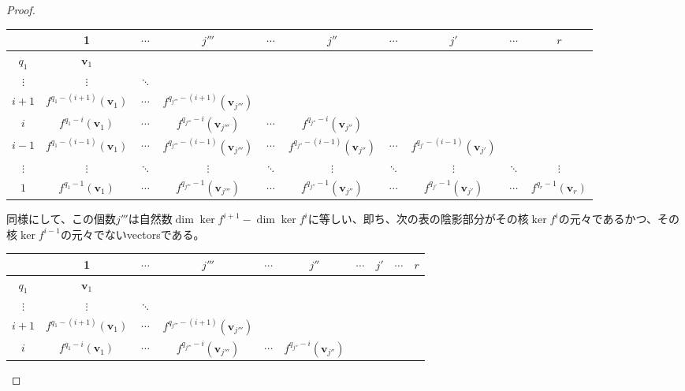 \documentclass[dvipdfmx]{jsarticle}
\begin{document}
\begin{proof}
\begin{longtable}[c]{c|ccccccccc}
&1&$\cdots$&$j'''$&$\cdots$&$j''$&$\cdots$&$j'$&$\cdots$&$r$ \\
\hline
$q_{1}$ & $\mathbf{v}_{1}$ & & & & & & & & \\
$\vdots$ & $\vdots$ & $\ddots$ & & & & & & & \\
$i + 1$ & $f^{q_{1} - (i + 1)}\left( \mathbf{v}_{1} \right)$ & $\cdots$ & $f^{q_{j'''} - (i + 1)}\left( \mathbf{v}_{j'''} \right)$ & & & & & & \\
$i$ & \cellcolor{lightgray} $f^{q_{1} - i}\left( \mathbf{v}_{1} \right)$ & \cellcolor{lightgray} $\cdots$ & \cellcolor{lightgray} $f^{q_{j'''} - i}\left( \mathbf{v}_{j'''} \right)$ & \cellcolor{lightgray} $\cdots$ & \cellcolor{lightgray} $f^{q_{j''} - i}\left( \mathbf{v}_{j''} \right)$ & & & & \\
$i - 1$ & $f^{q_{1} - (i - 1)}\left( \mathbf{v}_{1} \right)$ & $\cdots$ & $f^{q_{j'''} - (i - 1)}\left( \mathbf{v}_{j'''} \right)$ & $\cdots$ & $f^{q_{j''} - (i - 1)}\left( \mathbf{v}_{j''} \right)$ & $\cdots$ &
$f^{q_{j'} - (i - 1)}\left( \mathbf{v}_{j'} \right)$ & & \\
$\vdots$ & $\vdots$ & $\ddots$ & $\vdots$ & $\ddots$ & $\vdots$ & $\ddots$ & $\vdots$ & $\ddots$ & $\vdots$ \\
$1$ & $f^{q_{1} - 1}\left( \mathbf{v}_{1} \right)$ & $\cdots$ & $f^{q_{j'''} - 1}\left( \mathbf{v}_{j'''} \right)$ & $\cdots$ & $f^{q_{j''} - 1}\left( \mathbf{v}_{j''} \right)$ & $\cdots$ & $f^{q_{j'} - 1}\left( \mathbf{v}_{j'} \right)$ & $\cdots$ & $f^{q_{r} - 1}\left( \mathbf{v}_{r} \right)$ \\
\end{longtable}
同様にして、この個数$j'''$は自然数$\dim{\ker f^{i + 1}} - \dim{\ker f^{i}}$に等しい、即ち、次の表の陰影部分がその核$\ker f^{i}$の元々であるかつ、その核$\ker f^{i - 1}$の元々でないvectorsである。
\begin{longtable}[c]{c|ccccccccc}
&1&$\cdots$&$j'''$&$\cdots$&$j''$&$\cdots$&$j'$&$\cdots$&$r$ \\
\hline
$q_{1}$ & $\mathbf{v}_{1}$ & & & & & & & & \\
$\vdots$ & $\vdots$ & $\ddots$ & & & & & & & \\
$i + 1$ & \cellcolor{lightgray} $f^{q_{1} - (i + 1)}\left( \mathbf{v}_{1} \right)$ & \cellcolor{lightgray} $\cdots$ & \cellcolor{lightgray} $f^{q_{j'''} - (i + 1)}\left( \mathbf{v}_{j'''} \right)$ & & & & & & \\
$i$ & $f^{q_{1} - i}\left( \mathbf{v}_{1} \right)$ & $\cdots$ & $f^{q_{j'''} - i}\left( \mathbf{v}_{j'''} \right)$ & $\cdots$ & $f^{q_{j''} - i}\left( \mathbf{v}_{j''} \right)$ & & & & \\

\end{longtable}
\end{proof}
\end{document}
